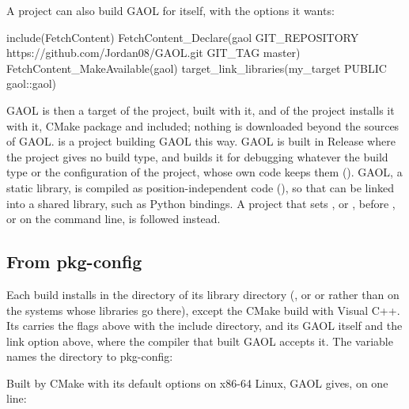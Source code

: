 \documentclass[12pt,a4paper,twoside,openright]{book}
\begin{document}
A project can also build GAOL for itself, with the options it wants:

\begin{example}
include(FetchContent)
FetchContent_Declare(gaol GIT_REPOSITORY
    https://github.com/Jordan08/GAOL.git GIT_TAG master)
FetchContent_MakeAvailable(gaol)
target_link_libraries(my_target PUBLIC gaol::gaol)
\end{example}

\noindent
GAOL is then a target of the project, built with it, and 
of the project installs it with it, CMake package and 
included; nothing is downloaded beyond the sources of GAOL.
 is a project building GAOL this way. GAOL is built
in Release where the project gives no build type, and
 builds it for debugging whatever the build type or
the configuration of the project, whose own code keeps them
().\newinvfive{} GAOL, a static library, is compiled
as position-independent code (), so that  can
be linked into a shared library, such as Python bindings. A project that sets
,  or , before
, or on the command line, is followed
instead.

\subsection{From pkg-config}\label{sec:compiling-pkgconfig}
%

Each build installs  in the  directory of its
library directory (, or  or
 rather than  on the systems whose
libraries go there), except the CMake build with Visual C++. Its
 carries the flags above with the include directory, and its
 GAOL itself and the link option above, where the compiler that
built GAOL accepts it. The variable  names the
directory to pkg-config:


\noindent
Built by CMake with its default options on x86-64 Linux, GAOL gives, on one
line:
\end{document}
